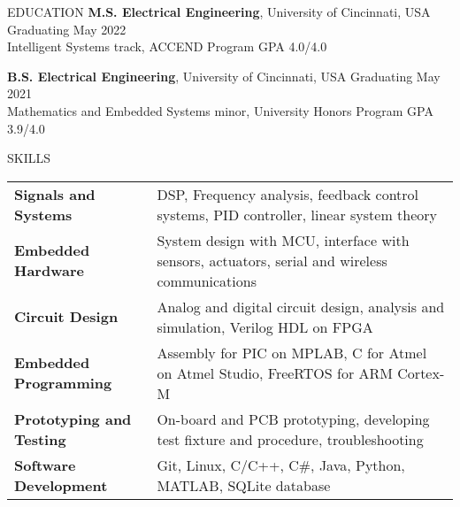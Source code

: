\documentclass{../lib/resume} %
\begin{document}
	


	
	\begin{rSection}{EDUCATION}
		{\bf M.S. Electrical Engineering}, University of Cincinnati, USA \hfill {Graduating May 2022} \\
		Intelligent Systems track, ACCEND Program \hfill GPA 4.0/4.0 \smallskip
		
		{\bf B.S. Electrical Engineering}, University of Cincinnati, USA \hfill {Graduating May 2021}\\
		Mathematics and Embedded Systems minor, University Honors Program \hfill {GPA 3.9/4.0}
		
		
		
		
	\end{rSection}
	
	\begin{rSection}{SKILLS}
		
		\begin{tabular}{ @{} >{\bfseries}l @{\hspace{2ex}} l }
			Signals and Systems & DSP, Frequency analysis, feedback control systems, PID controller, linear system theory	\\
			Embedded Hardware & System design with MCU, interface with sensors, actuators, serial and wireless communications \\ 
			Circuit Design & Analog and digital circuit design, analysis and simulation, Verilog HDL on FPGA \\
			Embedded Programming & Assembly for PIC on MPLAB, C for Atmel on Atmel Studio, FreeRTOS for ARM Cortex-M \\
			Prototyping and Testing &  On-board and PCB prototyping, developing test fixture and procedure, troubleshooting	\\
			Software Development & Git, Linux, C/C++, C\#, Java, Python, MATLAB, SQLite database \\
		\end{tabular}
	\end{rSection}
	
\end{document}
